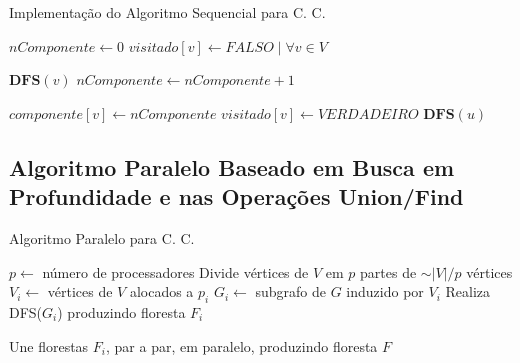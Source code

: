 \documentclass[12pt]{article}
\begin{document}
\begin{algorithm}[H]
    \DontPrintSemicolon
    \caption{Implementação do Algoritmo Sequencial para C. C.}
	{
        $nComponente \gets 0$\;
        $visitado[v] \gets FALSO \mid \forall v \in V$\;
    
        {
            {
                $\textbf{DFS}(v)$\;
                $nComponente \gets nComponente + 1$\;
            }
        }
    }
    
    {
        $componente[v] \gets nComponente$\; 
        $visitado[v] \gets VERDADEIRO$\;
        {
            {
                $\textbf{DFS}(u)$\;
            }
        }
    }
\end{algorithm}

\subsection{Algoritmo Paralelo Baseado em Busca em Profundidade e nas Operações Union/Find}

{\color{gray}\lipsum[1]}

\begin{algorithm}[H]
    \DontPrintSemicolon
    \caption{Algoritmo Paralelo para C. C.}
    {
        $p \gets$ número de processadores\;
        Divide vértices de $V$ em $p$ partes de $\sim|V|/p$ vértices\;
        {
            $V_i \gets$ vértices de $V$ alocados a $p_i$\;
            $G_i \gets$ subgrafo de $G$ induzido por $V_i$\;
            Realiza DFS($G_i$) produzindo floresta $F_i$\;
        }

        Une florestas $F_i$, par a par, em paralelo, produzindo floresta $F$\;
        
    }
\end{algorithm}
\end{document}
